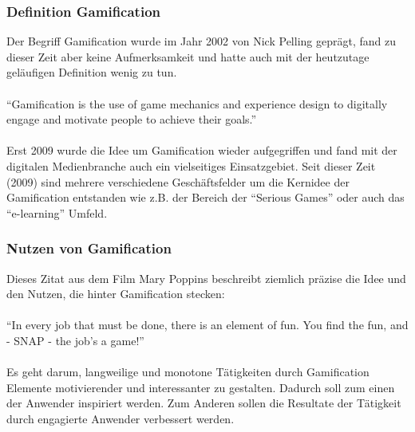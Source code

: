 \documentclass[a4paper,12pt]{scrartcl}
\begin{document}
\subsubsection{Definition Gamification}
Der Begriff Gamification wurde im Jahr 2002 von Nick Pelling geprägt, fand zu dieser Zeit aber keine Aufmerksamkeit und hatte auch mit der heutzutage geläufigen Definition wenig zu tun.
\\\\
\enquote{Gamification is the use of game mechanics and experience design to digitally engage and motivate people to achieve their goals.}\cite{gamificationDefinition}
\\\\
Erst 2009 wurde die Idee um Gamification wieder aufgegriffen und fand mit der digitalen Medienbranche auch ein vielseitiges Einsatzgebiet. Seit dieser Zeit (2009) sind mehrere verschiedene Geschäftsfelder um die Kernidee der Gamification entstanden wie z.B. der Bereich der \enquote{Serious Games} oder auch das \enquote{e-learning} Umfeld.  

\subsubsection{Nutzen von Gamification}
Dieses Zitat aus dem Film Mary Poppins beschreibt ziemlich präzise die Idee und den Nutzen, die hinter Gamification stecken:\\\\ 
\enquote{In every job that must be done, there is an element of fun. You find the fun, and - SNAP - the job's a game!} \footnotemark
{} 
\\\\
Es geht darum, langweilige und monotone Tätigkeiten durch Gamification Elemente motivierender und interessanter zu gestalten. Dadurch soll zum einen der Anwender inspiriert werden. Zum Anderen sollen die Resultate der Tätigkeit durch engagierte Anwender verbessert werden.
\end{document}
